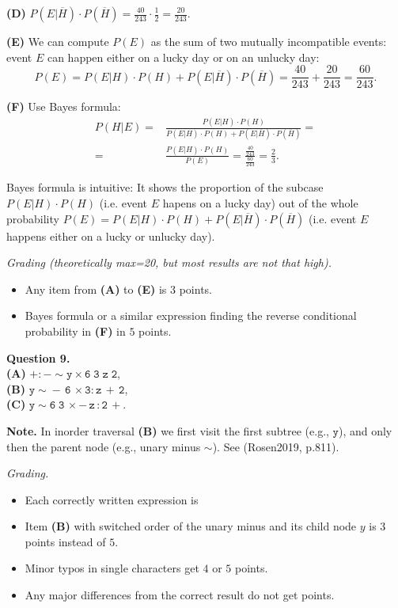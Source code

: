 \documentclass[jou]{apa6}
\begin{document}
{\bf (D)} $P(E|\overline{H}) \cdot P(\overline{H}) = \frac{40}{243}\cdot\frac{1}{2} = \frac{20}{243}$. 

{\bf (E)} We can compute $P(E)$ as the sum of two mutually incompatible events: 
event $E$ can happen either on a lucky day or on an unlucky day: 
$$P(E) = P(E|H)\cdot P(H) + P(E|\overline{H}) \cdot P(\overline{H}) = 
\frac{40}{243} + \frac{20}{243} = \frac{60}{243}.$$

{\bf (F)} Use Bayes formula: 
\begin{align}
P(H|E) = & \frac{P(E|H) \cdot P(H)}{P(E|H) \cdot P(H) + P(E|\overline{H}) \cdot P(\overline{H})} = \nonumber \\
 = & \frac{P(E|H) \cdot P(H)}{P(E)} =  \frac{ \frac{40}{243}}{ \frac{60}{243}} = \frac{2}{3}. \nonumber
\end{align}

Bayes formula is intuitive: It shows the proportion of the 
subcase $P(E|H) \cdot P(H)$ (i.e. event $E$ hapens on a lucky day) out of the
whole probability $P(E) = P(E|H)\cdot P(H) + P(E|\overline{H}) \cdot P(\overline{H})$
(i.e. event $E$ happens either on a lucky or unlucky day). 

{\scriptsize
{\em Grading (theoretically max=20, but most results are not that high).} 
\begin{itemize} 
\item Any item from {\bf (A)} to {\bf (E)} is $3$ points. 
\item Bayes formula or a similar expression finding the reverse conditional probability 
in {\bf (F)} in $5$ points.
\end{itemize}
}



\vspace{10pt}
{\bf Question 9.}\\
{\bf (A)} $\mathtt{+:-\sim{}y\times6\;3\;z\;2}$,\\
{\bf (B)} $\mathtt{y\sim{}-\,6\,\times3:z\,+\,2}$,\\
{\bf (C)} $\mathtt{y\sim{}6\;3\,\times-\,z\,:2\,+}$.

{\bf Note.} In inorder traversal {\bf (B)} we first visit 
the first subtree (e.g., $\mathtt{y}$), and only then the 
parent node (e.g., unary minus $\sim$). 
See (Rosen2019, p.811).


{\scriptsize
{\em Grading.} 
\begin{itemize}
\item Each correctly written expression is 
\item Item {\bf (B)} with switched order of the unary minus and its child node $y$ is
$3$ points instead of $5$.
\item Minor typos in single characters get $4$ or $5$ points.
\item Any major differences from the correct result do not get points.
\end{itemize}
}
\end{document}
